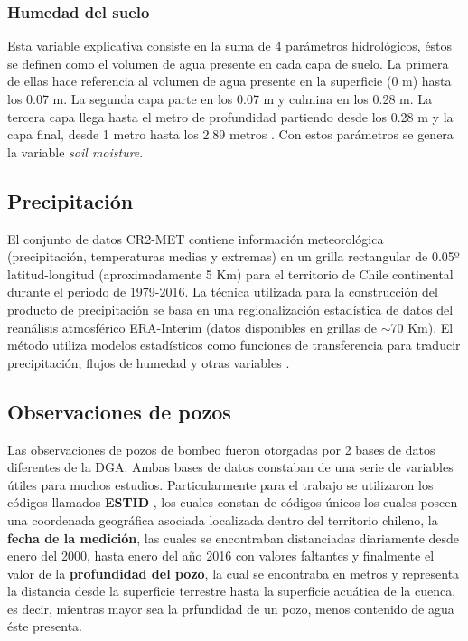     \subsubsection{Humedad del suelo}
    Esta variable explicativa consiste en la suma de 4 parámetros hidrológicos, éstos se definen como el volumen de agua presente en cada capa de suelo. La primera de ellas
    hace referencia al volumen de agua presente en la superficie (0 m) hasta los 0.07 m. La segunda capa parte en los 0.07 m y culmina en los 0.28 m. La tercera capa llega hasta el metro de profundidad partiendo desde los 0.28 m
    y la capa final, desde 1 metro hasta los 2.89 metros \cite{ERA5-L_doc}. Con estos parámetros se genera la variable \textit{soil moisture}.

    \subsection{Precipitación}
    El conjunto de datos CR2-MET contiene información meteorológica (precipitación, temperaturas medias y extremas) en un grilla rectangular de 0.05º latitud-longitud (aproximadamente 5 Km) para el territorio de Chile continental 
    durante el periodo de 1979-2016. La técnica utilizada para la construcción del producto de precipitación se basa en una regionalización estadística de datos del reanálisis atmosférico ERA-Interim (datos disponibles en grillas de $\sim$70 Km). 
    El método utiliza modelos estadísticos como funciones de transferencia para traducir precipitación, flujos de humedad y otras variables \cite{pr}.
    
    \subsection{Observaciones de pozos}
    Las observaciones de pozos de bombeo fueron otorgadas por 2 bases de datos diferentes de la DGA. Ambas bases de datos constaban de una serie de variables útiles para muchos estudios.
    Particularmente para el trabajo se utilizaron los códigos llamados \textbf{ESTID} \cite{gwl}, los cuales constan de códigos únicos los cuales poseen una coordenada geográfica asociada localizada dentro
    del territorio chileno, la \textbf{fecha de la medición}, las cuales se encontraban distanciadas diariamente desde enero del 2000, hasta enero del año 2016 con valores faltantes y finalmente el valor de la \textbf{profundidad del pozo},
    la cual se encontraba en metros y representa la distancia desde la superficie terrestre hasta la superficie acuática de la cuenca, es decir, mientras mayor sea la prfundidad de un pozo, menos contenido de agua éste presenta.


